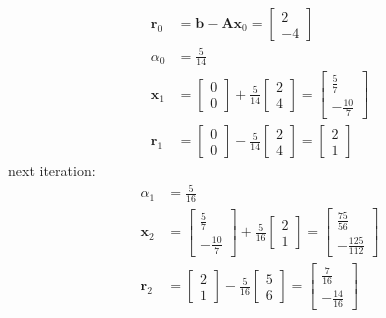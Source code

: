 \documentclass{article}
\begin{document}
\begin{align*}
    \bm{r}_0 &= \bm{b} - \bm{A}\bm{x}_0 = \begin{bmatrix}
        2\\
        -4
    \end{bmatrix} \\
    \alpha_0 &= \frac{5}{14} \\
    \bm{x}_1 &= \begin{bmatrix}
        0\\
        0
    \end{bmatrix} + \frac{5}{14}\begin{bmatrix}
        2 \\
        4
    \end{bmatrix} = \begin{bmatrix}
        \frac{5}{7} \\
        -\frac{10}{7}
    \end{bmatrix}\\
    \bm{r}_1 &= \begin{bmatrix}
        0\\
        0
    \end{bmatrix} - \frac{5}{14}\begin{bmatrix}
        2 \\
        4
    \end{bmatrix} = \begin{bmatrix}
        2\\
        1
    \end{bmatrix}
\end{align*}
next iteration:
\begin{align*}
    \alpha_1 &= \frac{5}{16} \\
    \bm{x}_2 &= \begin{bmatrix}
        \frac{5}{7} \\
        -\frac{10}{7}
    \end{bmatrix} + \frac{5}{16} \begin{bmatrix}
        2 \\
        1
    \end{bmatrix} = \begin{bmatrix}
        \frac{75}{56} \\
        -\frac{125}{112}
    \end{bmatrix} \\
    \bm{r}_2 &= \begin{bmatrix}
        2 \\
        1
    \end{bmatrix} - \frac{5}{16}\begin{bmatrix}
        5 \\
        6
    \end{bmatrix} = \begin{bmatrix}
        \frac{7}{16} \\
        -\frac{14}{16}
    \end{bmatrix}
\end{align*}
\end{document}

